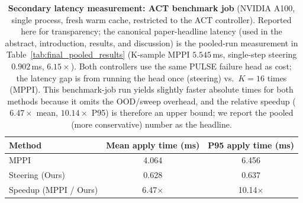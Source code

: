 \begin{table}[t]
\centering
\caption{\textbf{Secondary latency measurement: ACT benchmark job} (NVIDIA A100, single process, fresh warm cache, restricted to the ACT controller). Reported here for transparency; the canonical paper-headline latency (used in the abstract, introduction, results, and discussion) is the pooled-run measurement in Table~\ref{tab:final_pooled_results} (K-sample MPPI $5.545$\,ms, single-step steering $0.902$\,ms, $6.15\times$). Both controllers use the same PULSE failure head as cost; the latency gap is from running the head once (steering) vs.\ $K{=}16$ times (MPPI). This benchmark-job run yields slightly faster absolute times for both methods because it omits the OOD/sweep overhead, and the relative speedup ($6.47\times$ mean, $10.14\times$ P95) is therefore an upper bound; we report the pooled (more conservative) number as the headline.}
\label{tab:latency}
\begin{tabular}{lcc}
\toprule
Method & Mean apply time (ms) & P95 apply time (ms) \\
\midrule
MPPI & 4.064 & 6.456 \\
Steering (Ours) & 0.628 & 0.637 \\
\midrule
Speedup (MPPI / Ours) & 6.47$\times$ & 10.14$\times$ \\
\bottomrule
\end{tabular}
\end{table}
